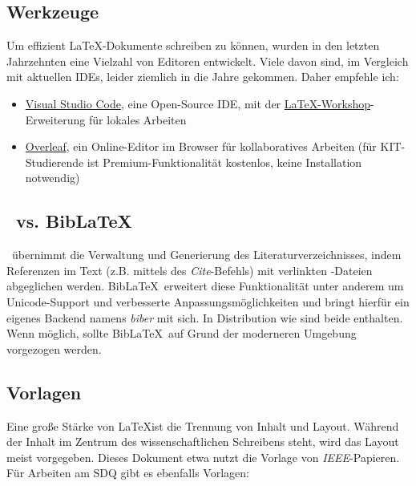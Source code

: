 \subsection{Werkzeuge}%
\label{sec:Schreiben:Werkzeuge}

Um effizient \LaTeX-Dokumente schreiben zu können, wurden in den letzten Jahrzehnten eine Vielzahl von Editoren entwickelt. Viele davon sind, im Vergleich mit aktuellen IDEs, leider ziemlich in die Jahre gekommen. Daher empfehle ich:

\smallskip
\begin{itemize}[label={\symbolTool}]
    \item \href{https://code.visualstudio.com/}{Visual Studio Code}, eine Open-Source IDE, mit der \href{https://marketplace.visualstudio.com/items?itemName=James-Yu.latex-workshop}{LaTeX-Workshop}-Erweiterung für lokales Arbeiten
    \item \href{http://overleaf.com/}{Overleaf}, ein Online-Editor im Browser für kollaboratives Arbeiten (für KIT-Studierende ist Premium-Funktionalität kostenlos, keine Installation notwendig)
\end{itemize}
\smallskip

\subsection{\bibtex\ vs. Bib\LaTeX}%
\label{sec:Schreiben:Bibtex}

\bibtex\ übernimmt die Verwaltung und Generierung des Literaturverzeichnisses, indem Referenzen im Text (z.B. mittels des \emph{Cite}-Befehls) mit verlinkten -Dateien abgeglichen werden.
Bib\LaTeX\ erweitert diese Funktionalität unter anderem um Unicode-Support und verbesserte Anpassungsmöglichkeiten und bringt hierfür ein eigenes Backend namens \emph{biber} mit sich.
In Distribution wie  sind beide enthalten.
Wenn möglich, sollte Bib\LaTeX\ auf Grund der moderneren Umgebung vorgezogen werden.

\subsection{Vorlagen}%
\label{sec:Schreiben:Vorlagen}

Eine große Stärke von \LaTeX ist die Trennung von Inhalt und Layout.
Während der Inhalt im Zentrum des wissenschaftlichen Schreibens steht, wird das Layout meist vorgegeben.
Dieses Dokument etwa nutzt die Vorlage von \emph{IEEE}-Papieren. Für Arbeiten am SDQ gibt es ebenfalls Vorlagen:

